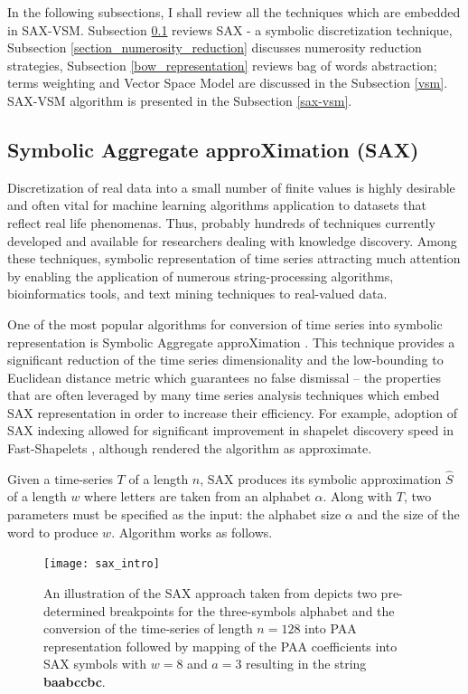 In the following subsections, I shall review all the techniques which are embedded in SAX-VSM. 
Subsection \ref{section-sax} reviews SAX - a symbolic discretization technique, 
Subsection \ref{section_numerosity_reduction} discusses numerosity reduction strategies,
Subsection \ref{bow_representation} reviews bag of words abstraction; 
terms weighting and Vector Space Model are discussed in the Subsection \ref{vsm}. 
SAX-VSM algorithm is presented in the Subsection \ref{sax-vsm}. 


\subsection{Symbolic Aggregate approXimation (SAX)}\label{section-sax}
Discretization of real data into a small number of finite values is highly desirable and often vital for machine learning 
algorithms application to datasets that reflect real life phenomenas. 
Thus, probably hundreds of techniques currently developed and available for researchers dealing with knowledge discovery.
Among these techniques, symbolic representation of time series attracting much attention by enabling the application of numerous 
string-processing algorithms, bioinformatics tools, and text mining techniques to real-valued data.

One of the most popular algorithms for conversion of time series into symbolic representation is Symbolic Aggregate approXimation \cite{sax}. 
This technique provides a significant reduction of the time series dimensionality and the low-bounding to Euclidean distance 
metric which guarantees no false dismissal \cite{citeulike:2821475} -- the properties that are often leveraged by many time 
series analysis techniques which embed SAX representation in order to increase their efficiency. 
For example, adoption of SAX indexing allowed for significant improvement in shapelet discovery speed in Fast-Shapelets 
\cite{citeulike:12563493}, although rendered the algorithm as approximate. 

Given a time-series $T$ of a length $n$, SAX produces its symbolic approximation $\hat{S}$ of a length $w$ where letters are taken 
from an alphabet $\alpha$. Along with $T$, two parameters must be specified as the input: the alphabet size $\alpha$ and the size of 
the word to produce $w$. Algorithm works as follows. 

\begin{figure}[tbp]
   \centering
   \texttt{[image: sax\_intro]}
   \caption{An illustration of the SAX approach taken from \cite{citeulike:2821475} depicts two pre-determined breakpoints for the 
   three-symbols alphabet and the conversion of the time-series of length $n=128$ into PAA representation followed by mapping of 
   the PAA coefficients into SAX symbols with $w=8$ and $a=3$ resulting in the string \textbf{baabccbc}.}
   \label{fig:sax_intro}
\end{figure}

